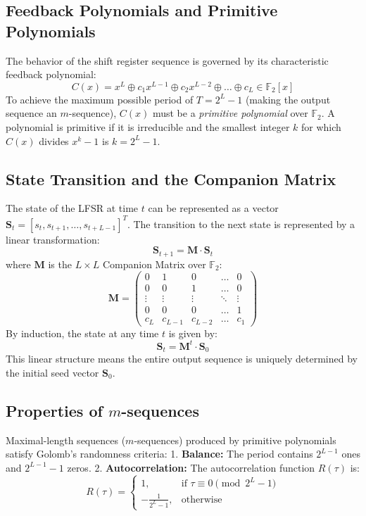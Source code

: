\subsection{Feedback Polynomials and Primitive Polynomials}
The behavior of the shift register sequence is governed by its characteristic feedback polynomial:
$$C(x) = x^L \oplus c_1 x^{L-1} \oplus c_2 x^{L-2} \oplus \dots \oplus c_L \in \mathbb{F}_2[x]$$
To achieve the maximum possible period of $T = 2^L - 1$ (making the output sequence an $m$-sequence), $C(x)$ must be a \textit{primitive polynomial} over $\mathbb{F}_2$. A polynomial is primitive if it is irreducible and the smallest integer $k$ for which $C(x)$ divides $x^k - 1$ is $k = 2^L - 1$.

\subsection{State Transition and the Companion Matrix}
The state of the LFSR at time $t$ can be represented as a vector $\mathbf{S}_t = [s_t, s_{t+1}, \dots, s_{t+L-1}]^T$. The transition to the next state is represented by a linear transformation:
$$\mathbf{S}_{t+1} = \mathbf{M} \cdot \mathbf{S}_t$$
where $\mathbf{M}$ is the $L \times L$ Companion Matrix over $\mathbb{F}_2$:
$$\mathbf{M} = \begin{pmatrix}
0 & 1 & 0 & \dots & 0 \\
0 & 0 & 1 & \dots & 0 \\
\vdots & \vdots & \vdots & \ddots & \vdots \\
0 & 0 & 0 & \dots & 1 \\
c_L & c_{L-1} & c_{L-2} & \dots & c_1
\end{pmatrix}$$
By induction, the state at any time $t$ is given by:
$$\mathbf{S}_t = \mathbf{M}^t \cdot \mathbf{S}_0$$
This linear structure means the entire output sequence is uniquely determined by the initial seed vector $\mathbf{S}_0$.

\subsection{Properties of $m$-sequences}
Maximal-length sequences ($m$-sequences) produced by primitive polynomials satisfy Golomb's randomness criteria:
1.  \textbf{Balance:} The period contains $2^{L-1}$ ones and $2^{L-1}-1$ zeros.
2.  \textbf{Autocorrelation:} The autocorrelation function $R(\tau)$ is:
    $$R(\tau) = \begin{cases}
    1, & \text{if } \tau \equiv 0 \pmod{2^L-1} \\
    -\frac{1}{2^L-1}, & \text{otherwise}
    \end{cases}$$

